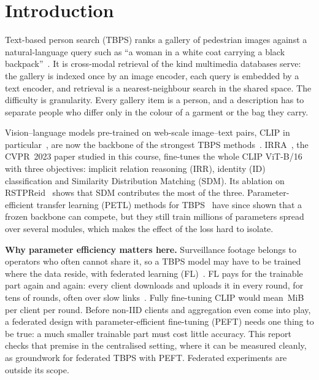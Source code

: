 \section{Introduction}\label{sec:intro}

Text-based person search (TBPS) ranks a gallery of pedestrian images against a natural-language query such as ``a woman in a white coat carrying a black backpack''~\cite{li2017personsearchnaturallanguage}. It is cross-modal retrieval of the kind multimedia databases serve: the gallery is indexed once by an image encoder, each query is embedded by a text encoder, and retrieval is a nearest-neighbour search in the shared space. The difficulty is granularity. Every gallery item is a person, and a description has to separate people who differ only in the colour of a garment or the bag they carry.

Vision--language models pre-trained on web-scale image--text pairs, CLIP in particular~\cite{radford2021learningtransferablevisualmodels}, are now the backbone of the strongest TBPS methods~\cite{yan2022clipdrivenfinegrainedtextimageperson,cao2023empiricalstudycliptextbased}. IRRA~\cite{jiang2023crossmodalimplicitrelationreasoning}, the CVPR~2023 paper studied in this course, fine-tunes the whole CLIP ViT-B/16 with three objectives: implicit relation reasoning (IRR), identity (ID) classification and Similarity Distribution Matching (SDM). Its ablation on RSTPReid~\cite{Zhu_2021} shows that SDM contributes the most of the three. Parameter-efficient transfer learning (PETL) methods for TBPS~\cite{liu2024clipbasedsynergisticknowledgetransfer,liu2025dmadapterdomainawaremixtureofadapterstextbased,liu2025uppersonunifiedparameterefficienttransfer} have since shown that a frozen backbone can compete, but they still train millions of parameters spread over several modules, which makes the effect of the loss hard to isolate.

\textbf{Why parameter efficiency matters here.} Surveillance footage belongs to operators who often cannot share it, so a TBPS model may have to be trained where the data reside, with federated learning (FL)~\cite{mcmahan2023communicationefficientlearningdeepnetworks,Ma_2024}. FL pays for the trainable part again and again: every client downloads and uploads it in every round, for tens of rounds, often over slow links~\cite{Ma_2024}. Fully fine-tuning CLIP would mean \fullMiB\,MiB per client per round. Before non-IID clients and aggregation even come into play, a federated design with parameter-efficient fine-tuning (PEFT) needs one thing to be true: a much smaller trainable part must cost little accuracy. This report checks that premise in the centralised setting, where it can be measured cleanly, as groundwork for federated TBPS with PEFT. Federated experiments are outside its scope.


